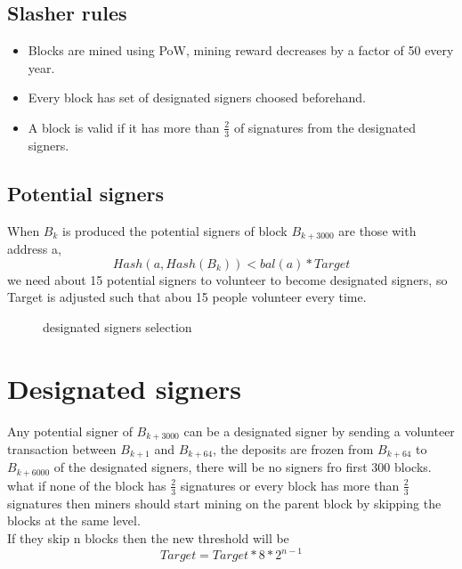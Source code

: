 \documentclass{article}
\begin{document}
\subsection{Slasher rules}
\begin{itemize}
    \item Blocks are mined using PoW, mining reward decreases by a factor of 50 every year.
    \item Every block has set of designated signers choosed beforehand.
    \item A block is valid if it has more than $\frac{2}{3}$ of signatures from the designated signers.
\end{itemize}
\subsection{Potential signers}
When $B_k$ is produced the potential signers of block $B_{k+3000}$ are those with address a,
$$Hash(a, Hash(B_k)) < bal(a)*Target$$
we need about 15 potential signers to volunteer to become designated signers, so Target is adjusted such that abou 15 people volunteer every time.
\begin{figure}
\centering
{}
\caption{designated signers selection}
\end{figure}
\section{Designated signers}
Any potential signer of $B_{k+3000}$ can be a designated signer by sending a volunteer transaction between $B_{k+1}$ and $B_{k+64}$, the deposits are frozen from $B_{k+64}$ to $B_{k+6000}$ of the designated signers, there will be no signers fro first 300 blocks.
what if none of the block has $\frac{2}{3}$ signatures or every block has more than $\frac{2}{3}$ signatures then miners should start mining on the parent block by skipping the blocks at the same level. \\
If they skip n blocks then the new threshold will be 
$$Target = Target * 8 * 2^{n-1}$$
\end{document}
